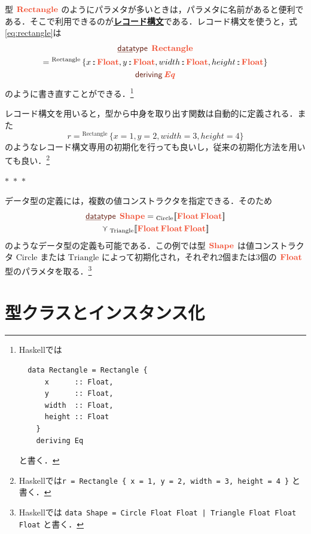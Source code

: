 \documentclass[a5paper,twoside,fleqn,draft]{jsbook}
\def\[{[\![}
\def\]{]\!]}
\def\keywordColor{Sepia}
\def\varColor{NavyBlue}
\def\typeColor{RedOrange}
\newcommand{\separator}{\begin{center}$*$~$*$~$*$\end{center}}
\newcommand{\programminglanguage}[1]{\textsf{#1}}
\newcommand{\haskell}{\programminglanguage{Haskell}}
\newcommand{\keyword}[1]{{\underline{\textbf{#1}}}}
\newcommand{\code}[1]{\texttt{#1}}
\newcommand{\mKeyword}[1]{\textcolor{\keywordColor}{\mathsf{#1}}}
\newcommand{\mKeywordUnderline}[1]{\textcolor{\keywordColor}{\text{\underline{\textsf{#1}}}}}
\newcommand{\mDataTypeKeyword}{\mKeywordUnderline{data}\mKeyword{type}}
\newcommand{\mDerivingKeyword}{\mKeyword{deriving}}
\DeclareMathOperator{\mDataType}{\mDataTypeKeyword}
\DeclareMathOperator{\mDeriving}{\mDerivingKeyword}
\newcommand{\mVar}[1]{\textcolor{\varColor}{#1}}
\DeclareMathOperator{\mIn}{{:\!:}}
\DeclareMathOperator{\mValueOr}{\curlyvee}
\newcommand{\mType}[1]{\textcolor{\typeColor}{\mathbf{#1}}}
\newcommand{\mFloatType}{\mType{Float}}
\newcommand{\mValueConstructor}[1]{\mathrm{#1}}
\newcommand{\mValueWith}[2]{{}_\mValueConstructor{#1}\[\mVar{#2}\]}
\newcommand{\mValueRecordBeginWith}[1]{{}^\mValueConstructor{#1}\,\{}
\newcommand{\mValueRecordEnd}{\}}
\newcommand{\mValueRecordWith}[2]{\mValueRecordBeginWith{#1}{#2}\mValueRecordEnd}
\newcommand{\mTypeClass}[1]{\textcolor{\typeColor}{\textbf{\textit{#1}}}}
\newcommand{\mEqTypeClass}{\mTypeClass{Eq}}
\begin{document}
型 $\mType{Rectangle}$ のようにパラメタが多いときは，パラメタに名前があると便利である．そこで利用できるのが\keyword{レコード構文}である．レコード構文を使うと，式\eqref{eq:rectangle}は
\begin{multline}
  \mDataType\;\mType{Rectangle}\\
  =\mValueRecordBeginWith{Rectangle}
  x\mIn\mFloatType,
  y\mIn\mFloatType,
  width\mIn\mFloatType,
  height\mIn\mFloatType
  \mValueRecordEnd\\
  \mDeriving\mEqTypeClass
\end{multline}
のように書き直すことができる．\footnote{\haskell では
\begin{verbatim}
  data Rectangle = Rectangle {
      x      :: Float,
      y      :: Float,
      width  :: Float,
      height :: Float
    }
    deriving Eq
\end{verbatim}
と書く．}

レコード構文を用いると，型から中身を取り出す関数は自動的に定義される．また
\begin{equation}
  r=
  \mValueRecordWith{Rectangle}{
    x=1,
    y=2,
    width=3,
    height=4
  }
\end{equation}
のようなレコード構文専用の初期化を行っても良いし，従来の初期化方法を用いても良い．\footnote{\haskell では\code{r = Rectangle \{ x = 1, y = 2, width = 3, height = 4 \}} と書く．}

\separator

データ型の定義には，複数の値コンストラクタを指定できる．そのため
\begin{multline}
\mDataType\;\mType{Shape}
=\mValueWith{Circle}{\mFloatType\,\mFloatType}\\
\mValueOr
\mValueWith{Triangle}{\mFloatType\,\mFloatType\,\mFloatType}
\end{multline}
のようなデータ型の定義も可能である．この例では型 $\mType{Shape}$ は値コンストラクタ $\mValueConstructor{Circle}$ または $\mValueConstructor{Triangle}$ によって初期化され，それぞれ2個または3個の $\mFloatType$ 型のパラメタを取る．\footnote{\haskell では \code{data Shape = Circle Float Float | Triangle Float Float Float} と書く．}

\section{型クラスとインスタンス化}
\label{sec:type-class-and-instance}
\end{document}
